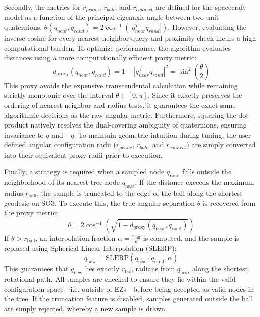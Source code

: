 Secondly, the metrics for $r_{prune}$, $r_{ball}$, and $r_{connect}$ are defined for the spacecraft model as a function of the principal eigenaxis angle between two unit quaternions, $\theta(q_{near}, q_{rand}) = 2 \cos^{-1}(|q_{near}^T q_{rand}|)$. 
However, evaluating the inverse cosine for every nearest-neighbor query and proximity check incurs a high computational burden. 
To optimize performance, the algorithm evaluates distances using a more computationally efficient proxy metric:
\begin{equation}
    d_{\text{proxy}}(q_{near}, q_{rand}) = 1 - |q_{near}^\top q_{rand}|^2 = \sin^2\left(\frac{\theta}{2}\right)
\end{equation}
This proxy avoids the expensive transcendental calculation while remaining strictly monotonic over the interval $\theta \in [0, \pi]$. 
Since it exactly preserves the ordering of nearest-neighbor and radius tests, it guarantees the exact same algorithmic decisions as the raw angular metric. 
Furthermore, squaring the dot product natively resolves the dual-covering ambiguity of quaternions, ensuring invariance to $q$ and $-q$. 
To maintain geometric intuition during tuning, the user-defined angular configuration radii ($r_{prune}$, $r_{ball}$, and $r_{connect}$) are simply converted into their equivalent proxy radii prior to execution.

Finally, a strategy is required when a sampled node $q_{\text{rand}}$ falls outside the neighborhood of its nearest tree node $q_{\text{near}}$. 
If the distance exceeds the maximum radius $r_{\text{ball}}$, the sample is truncated to the edge of the ball along the shortest geodesic on \ac{SO3}. To execute this, the true angular separation $\theta$ is recovered from the proxy metric:
\begin{equation}
    \theta = 2 \cos^{-1} \left( \sqrt{1 - d_{\text{proxy}}(q_{\text{near}}, q_{\text{rand}})} \right)
\end{equation}
If $\theta > r_{\text{ball}}$, an interpolation fraction $\alpha = \frac{r_{\text{ball}}}{\theta}$ is computed, and the sample is replaced using Spherical Linear Interpolation (SLERP):
\begin{equation}
    q_{\text{new}} = \text{SLERP}(q_{\text{near}}, q_{\text{rand}}, \alpha)
\end{equation}
This guarantees that $q_{\text{new}}$ lies exactly $r_{\text{ball}}$ radians from $q_{\text{near}}$ along the shortest rotational path. 
All samples are checked to ensure they lie within the valid configuration space---i.e. outside of \ac{EZ}s---before being accepted as valid nodes in the tree.
If the truncation feature is disabled, samples generated outside the ball are simply rejected, whereby a new sample is drawn.

